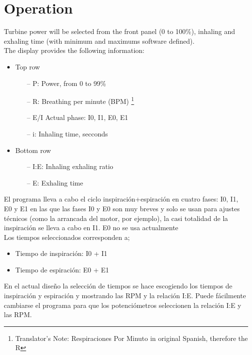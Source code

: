\section{Operation}
    Turbine power will be selected from the front panel (0 to 100\%), inhaling and exhaling time (with minimum and maximums software defined).\\
    
    The display provides the following information:
    \begin{itemize}
        \item Top row
        \begin{itemize}
            \item[--] P: Power, from 0 to 99\%
            \item[--] R: Breathing per minute (BPM) \footnote{Translator's Note: Respiraciones Por Minuto in original Spanish, therefore the R}
            \item[--] E/I Actual phase: I0, I1, E0, E1
            \item[--] i: Inhaling time, secconds
        \end{itemize}
        \item Bottom row
        \begin{itemize}
            \item[--] I:E: Inhaling exhaling ratio
            \item[--] E: Exhaling time
        \end{itemize}
    \end{itemize}
    
    
    El programa lleva a cabo el ciclo inspiración+espiración en cuatro fases: I0, I1, E0 y E1 en las que las fases I0 y E0 son muy breves y solo se usan para ajustes técnicos (como la arrancada del motor, por ejemplo), la casi totalidad de la inspiración se lleva a cabo en I1. E0 no se usa actualmente\\
    
    Los tiempos seleccionados corresponden a;
    \begin{itemize}
        \item Tiempo de inspiración: I0 + I1
        \item Tiempo de espiración: E0 + E1
    \end{itemize}
    
    En el actual diseño la selección de tiempos se hace escogiendo los tiempos de inspiración y espiración y mostrando las RPM y la relación I:E. Puede fácilmente cambiarse el programa para que los potenciómetros seleccionen la relación I:E y las RPM.